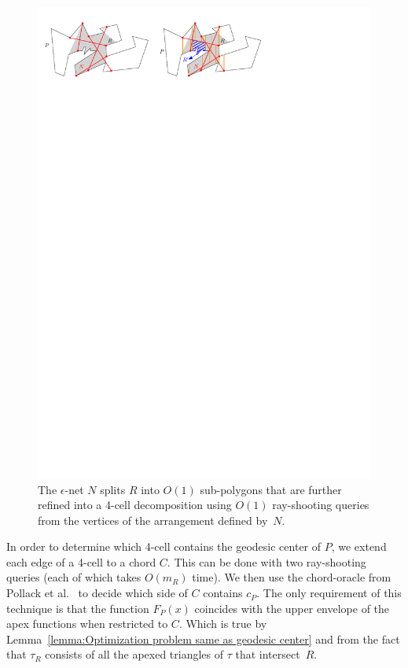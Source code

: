 \documentclass[a4paper,UKenglish]{lipics}
\newcommand{\F}[2]{\ensuremath{F_{\scriptscriptstyle #1}(#2)}}
\newcommand{\cp}{\ensuremath{c_P}}
\newcommand{\m}{\ensuremath{m_{\scriptscriptstyle R}}}
\newcommand{\tcell}{4-cell\xspace}
\begin{document}
\begin{figure}[tb]
\centering
\includegraphics{img/CuttingOfChords.pdf}

\caption{\small The $\epsilon$-net $N$ splits $R$ into $O(1)$ sub-polygons that are further refined into a \tcell decomposition using $O(1)$ ray-shooting queries from the vertices of the arrangement defined by~$N$.}
\label{fig:Cutting of Chords}
\end{figure}

In order to determine which \tcell contains the geodesic center of $P$, 
we extend each edge of a \tcell to a chord $C$. 
This can be done with two ray-shooting queries (each of which takes $O(\m)$ time).
We then use the chord-oracle from Pollack et al.~\cite[Section~3]{pollackComputingCenter} to decide which side of $C$ contains $\cp$.
The only requirement of this technique is that the function $\F{P}{x}$ coincides with the upper envelope of the apex functions when restricted to $C$.
Which is true by Lemma~\ref{lemma:Optimization problem same as geodesic center} and from the fact that $\tau_R$ consists of all the apexed triangles of $\tau$ that intersect~$R$.
\end{document}
